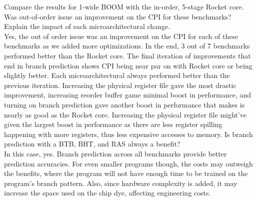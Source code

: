 \documentclass[11pt]{article}
\begin{document}
\begin{Parts}
	\Part Compare the results for 1-wide BOOM with the in-order, 5-stage Rocket core. Was out-of-order issue an improvement on the CPI for these benchmarks? Explain the impact of each microarchitectural change. \\
	Yes, the out of order issue was an improvement on the CPI for each of these benchmarks as we added more optimizations. In the end, 3 out of 7 benchmarks performed better than the Rocket core. The final iteration of improvements that end in branch prediction shows CPI being near par on with Rocket core or being slightly better. Each microarchitectural always performed better than the previous iteration. Increasing the physical register file gave the most drastic improvement, increasing reorder buffer game minimal boost in performance, and turning on branch prediction gave another boost in performance that makes is nearly as good as the Rocket core. Increasing the physical register file might've given the largest boost in performance as there are less register spilling happening with more registers, thus less expensive accesses to memory.
	\Part Is branch prediction with a BTB, BHT, and RAS always a benefit? \\
	In this case, yes. Branch prediction across all benchmarks provide better prediction accuracies. For even smaller programs though, the costs may outweigh the benefits, where the program will not have enough time to be trained on the program's branch pattern. Also, since hardware complexity is added, it may increase the space used on the chip dye, affecting engineering costs.
\end{Parts}
\newpage

\end{document}
